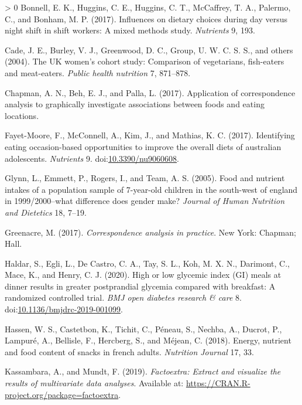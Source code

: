 \documentclass[utf8]{frontiersSCNS}
\newlength{\cslhangindent}
\newenvironment{CSLReferences}[3] %
 {%
  \setlength{\parindent}{0pt}
  \ifodd #1 \everypar{\setlength{\hangindent}{\cslhangindent}}\ignorespaces\fi
  \ifnum #2 > 0
  \setlength{\parskip}{#2\baselineskip}
  \fi
 }%
 {}
\begin{document}
\begin{CSLReferences}{1}{0}
\leavevmode\hypertarget{ref-bonnell2017influences}{}%
Bonnell, E. K., Huggins, C. E., Huggins, C. T., McCaffrey, T. A.,
Palermo, C., and Bonham, M. P. (2017). Influences on dietary choices
during day versus night shift in shift workers: A mixed methods study.
\emph{Nutrients} 9, 193.

\leavevmode\hypertarget{ref-cade2004uk}{}%
Cade, J. E., Burley, V. J., Greenwood, D. C., Group, U. W. C. S. S., and
others (2004). The UK women's cohort study: Comparison of vegetarians,
fish-eaters and meat-eaters. \emph{Public health nutrition} 7, 871--878.

\leavevmode\hypertarget{ref-Chapman2017}{}%
Chapman, A. N., Beh, E. J., and Palla, L. (2017). Application of
correspondence analysis to graphically investigate associations between
foods and eating locations.

\leavevmode\hypertarget{ref-FayetMoore2017}{}%
Fayet-Moore, F., McConnell, A., Kim, J., and Mathias, K. C. (2017).
Identifying eating occasion-based opportunities to improve the overall
diets of australian adolescents. \emph{Nutrients} 9.
doi:\href{https://doi.org/10.3390/nu9060608}{10.3390/nu9060608}.

\leavevmode\hypertarget{ref-glynn2005food}{}%
Glynn, L., Emmett, P., Rogers, I., and Team, A. S. (2005). Food and
nutrient intakes of a population sample of 7-year-old children in the
south-west of england in 1999/2000--what difference does gender make?
\emph{Journal of Human Nutrition and Dietetics} 18, 7--19.

\leavevmode\hypertarget{ref-greenacre2017correspondence}{}%
Greenacre, M. (2017). \emph{Correspondence analysis in practice}. New
York: Chapman; Hall.

\leavevmode\hypertarget{ref-Haldar2020}{}%
Haldar, S., Egli, L., De Castro, C. A., Tay, S. L., Koh, M. X. N.,
Darimont, C., Mace, K., and Henry, C. J. (2020). High or low glycemic
index (GI) meals at dinner results in greater postprandial glycemia
compared with breakfast: A randomized controlled trial. \emph{BMJ open
diabetes research \& care} 8.
doi:\href{https://doi.org/10.1136/bmjdrc-2019-001099}{10.1136/bmjdrc-2019-001099}.

\leavevmode\hypertarget{ref-Hassen2018}{}%
Hassen, W. S., Castetbon, K., Tichit, C., Péneau, S., Nechba, A.,
Ducrot, P., Lampuré, A., Bellisle, F., Hercberg, S., and Méjean, C.
(2018). Energy, nutrient and food content of snacks in french adults.
\emph{Nutrition Journal} 17, 33.

\leavevmode\hypertarget{ref-factoextra}{}%
Kassambara, A., and Mundt, F. (2019). \emph{Factoextra: Extract and
visualize the results of multivariate data analyses}. Available at:
\url{https://CRAN.R-project.org/package=factoextra}.


\end{CSLReferences}
\end{document}
